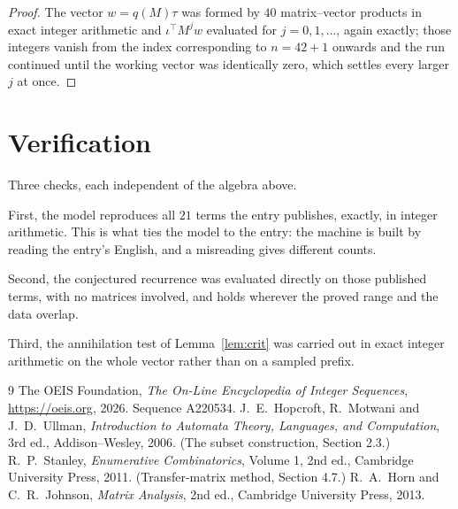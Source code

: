 \documentclass[11pt,a4paper]{article}
\theoremstyle{plain}
\theoremstyle{definition}
\begin{document}
\begin{proof}
The vector $w=q(M)\tau$ was formed by $40$ matrix--vector products in exact integer
arithmetic and $\iota^{\!\top}M^{j}w$ evaluated for $j=0,1,\dots$, again exactly; those
integers vanish from the index corresponding to $n=42+1$ onwards and the run continued
until the working vector was identically zero, which settles every larger $j$ at once.
\end{proof}

\section{Verification}

Three checks, each independent of the algebra above.

First, the model reproduces all $21$ terms the entry publishes, exactly, in integer
arithmetic. This is what ties the model to the entry: the machine is built by reading the
entry's English, and a misreading gives different counts.

Second, the conjectured recurrence was evaluated directly on those published terms, with no
matrices involved, and holds wherever the proved range and the data overlap.

Third, the annihilation test of Lemma~\ref{lem:crit} was carried out in exact integer
arithmetic on the whole vector rather than on a sampled prefix.

\begin{thebibliography}{9}
 The OEIS Foundation, \emph{The On-Line Encyclopedia of Integer
Sequences}, \url{https://oeis.org}, 2026. Sequence A220534.
 J.~E.~Hopcroft, R.~Motwani and J.~D.~Ullman, \emph{Introduction to Automata
Theory, Languages, and Computation}, 3rd ed., Addison--Wesley, 2006. (The subset
construction, Section 2.3.)
 R.~P.~Stanley, \emph{Enumerative Combinatorics}, Volume 1, 2nd ed.,
Cambridge University Press, 2011. (Transfer-matrix method, Section 4.7.)
 R.~A.~Horn and C.~R.~Johnson, \emph{Matrix Analysis}, 2nd ed., Cambridge
University Press, 2013.
\end{thebibliography}
\end{document}
